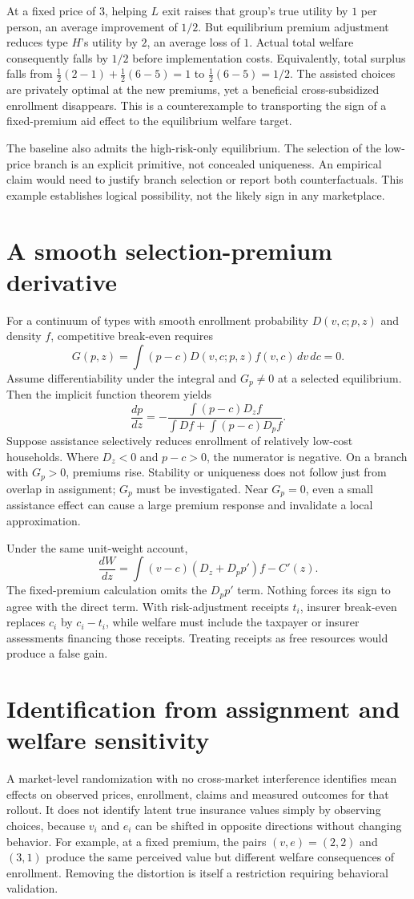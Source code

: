 \documentclass[11pt]{article}
\begin{document}
At a fixed price of $3$, helping $L$ exit raises that group's true utility by $1$ per person, an average improvement of $1/2$. But equilibrium premium adjustment reduces type $H$'s utility by $2$, an average loss of $1$. Actual total welfare consequently falls by $1/2$ before implementation costs. Equivalently, total surplus falls from
$\tfrac12(2-1)+\tfrac12(6-5)=1$ to $\tfrac12(6-5)=1/2$.
The assisted choices are privately optimal at the new premiums, yet a beneficial cross-subsidized enrollment disappears. This is a counterexample to transporting the sign of a fixed-premium aid effect to the equilibrium welfare target.

The baseline also admits the high-risk-only equilibrium. The selection of the low-price branch is an explicit primitive, not concealed uniqueness. An empirical claim would need to justify branch selection or report both counterfactuals. This example establishes logical possibility, not the likely sign in any marketplace.

\section{A smooth selection-premium derivative}
For a continuum of types with smooth enrollment probability $D(v,c;p,z)$ and density $f$, competitive break-even requires
\[
 G(p,z)=\int(p-c)D(v,c;p,z)f(v,c)\,dv\,dc=0.
\]
Assume differentiability under the integral and $G_p\neq0$ at a selected equilibrium. Then the implicit function theorem yields
\[
 \frac{dp}{dz}=-\frac{\int(p-c)D_z f}{\int Df+\int(p-c)D_pf}.
\]
Suppose assistance selectively reduces enrollment of relatively low-cost households. Where $D_z<0$ and $p-c>0$, the numerator is negative. On a branch with $G_p>0$, premiums rise. Stability or uniqueness does not follow just from overlap in assignment; $G_p$ must be investigated. Near $G_p=0$, even a small assistance effect can cause a large premium response and invalidate a local approximation.

Under the same unit-weight account,
\[
 \frac{dW}{dz}=\int(v-c)(D_z+D_pp')f-C'(z).
\]
The fixed-premium calculation omits the $D_pp'$ term. Nothing forces its sign to agree with the direct term. With risk-adjustment receipts $t_i$, insurer break-even replaces $c_i$ by $c_i-t_i$, while welfare must include the taxpayer or insurer assessments financing those receipts. Treating receipts as free resources would produce a false gain.

\section{Identification from assignment and welfare sensitivity}
A market-level randomization with no cross-market interference identifies mean effects on observed prices, enrollment, claims and measured outcomes for that rollout. It does not identify latent true insurance values simply by observing choices, because $v_i$ and $e_i$ can be shifted in opposite directions without changing behavior. For example, at a fixed premium, the pairs $(v,e)=(2,2)$ and $(3,1)$ produce the same perceived value but different welfare consequences of enrollment. Removing the distortion is itself a restriction requiring behavioral validation.
\end{document}
